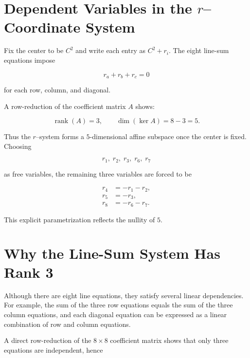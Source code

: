 \documentclass[12pt]{article}
\begin{document}

\section*{Dependent Variables in the $r$--Coordinate System}

Fix the center to be $C^2$ and write each entry as $C^2 + r_i$.  
The eight line-sum equations impose


\[
r_a + r_b + r_c = 0
\]


for each row, column, and diagonal.

A row-reduction of the coefficient matrix $A$ shows:


\[
\operatorname{rank}(A)=3,
\qquad
\dim(\ker A)=8-3=5.
\]



Thus the $r$--system forms a $5$-dimensional affine subspace once the center is
fixed.  Choosing


\[
r_1,\; r_2,\; r_3,\; r_6,\; r_7
\]


as free variables, the remaining three variables are forced to be


\[
\begin{aligned}
r_4 &= -r_1 - r_2,\\
r_5 &= -r_3,\\
r_8 &= -r_6 - r_7.
\end{aligned}
\]



This explicit parametrization reflects the nullity of $5$.



\section*{Why the Line-Sum System Has Rank 3}

Although there are eight line equations, they satisfy several linear
dependencies.  For example, the sum of the three row equations equals the sum
of the three column equations, and each diagonal equation can be expressed as a
linear combination of row and column equations.

A direct row-reduction of the $8\times 8$ coefficient matrix shows that only
three equations are independent, hence
\end{document}
